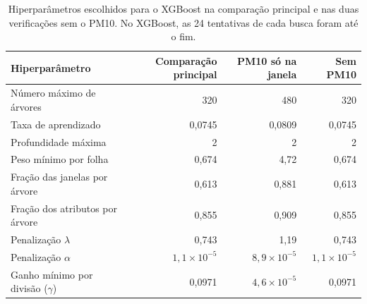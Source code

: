 \begin{table}[!htbp]
    \centering
    \caption[Hiperparâmetros escolhidos para o XGBoost]{Hiperparâmetros escolhidos para o XGBoost na comparação principal e nas duas verificações sem o PM10. No XGBoost, as 24 tentativas de cada busca foram até o fim.}
    \label{tab:hpo_xgboost}
    \small
    \begin{tabular}{lrrr}
        \toprule
        Hiperparâmetro & Comparação principal & PM10 só na janela & Sem PM10 \\
        \midrule
        Número máximo de árvores & 320 & 480 & 320 \\
        Taxa de aprendizado & 0,0745 & 0,0809 & 0,0745 \\
        Profundidade máxima & 2 & 2 & 2 \\
        Peso mínimo por folha & 0,674 & 4,72 & 0,674 \\
        Fração das janelas por árvore & 0,613 & 0,881 & 0,613 \\
        Fração dos atributos por árvore & 0,855 & 0,909 & 0,855 \\
        Penalização $\lambda$ & 0,743 & 1,19 & 0,743 \\
        Penalização $\alpha$ & $1{,}1\times10^{-5}$ & $8{,}9\times10^{-5}$ & $1{,}1\times10^{-5}$ \\
        Ganho mínimo por divisão ($\gamma$) & 0,0971 & $4{,}6\times10^{-5}$ & 0,0971 \\
        \bottomrule
    \end{tabular}
\end{table}

